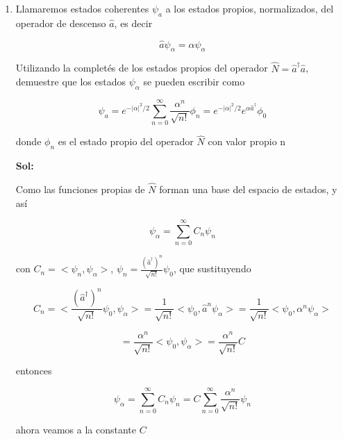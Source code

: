 \documentclass[12pt,a4paper]{article}
\begin{document}
\begin{enumerate}



\item Llamaremos estados coherentes $\psi_{a}$ a los estados propios, normalizados, del operador de descenso $\hat{a}$, es decir

\begin{equation*}
    \hat{a} \psi_{\alpha} = \alpha \psi_{\alpha}
\end{equation*}

Utilizando la completés de los estados propios del operador $\hat{N} = \hat{a}^{\dagger}\hat{a}$, demuestre que los estados $\psi_{\alpha}$ se pueden escribir como

\begin{equation*}
    \psi_a = e^{-|\alpha|^{2}/2} \sum_{n=0}^{\infty} \frac{\alpha^n}{\sqrt{n!}}\phi_{n} = e^{-|\alpha|^{2}/2} e^{\alpha \hat{a}^{\dagger}} \phi_0
\end{equation*}

donde $\phi_n$ es el estado propio del operador $\hat{N}$ con valor propio n

\textbf{Sol:}

Como las funciones propias de $\hat{N}$ forman una base del espacio de estados, y así

\begin{equation*}
    \psi_\alpha = \sum_{n = 0}^{\infty} C_n  \psi_n
\end{equation*}

con $C_n = <\psi_n , \psi_\alpha>$, $\psi_{n} = \frac{(\hat{a}^{\dagger})^{n}}{\sqrt{n!}} \psi_0$, que sustituyendo

\begin{equation*}
    C_n = <\frac{(\hat{a}^{\dagger})^{n}}{\sqrt{n!}} \psi_0,\psi_\alpha> = \frac{1}{\sqrt{n!}}<\psi_0, \hat{a}^{n} \psi_{\alpha}> = \frac{1}{\sqrt{n!}} <\psi_0, \alpha^n \psi_{\alpha}>
\end{equation*}

\begin{equation*}
    = \frac{\alpha^n}{\sqrt{n!}} <\psi_0, \psi_\alpha>= \frac{\alpha^n}{\sqrt{n!}} C
\end{equation*}

entonces

\begin{equation*}
    \psi_{\alpha} = \sum_{n=0}^{\infty} C_n \psi_n = C \sum_{n=0}^{\infty} \frac{\alpha^n}{\sqrt{n!}} \psi_n
\end{equation*}

ahora veamos a la constante $C$


\end{enumerate}
\end{document}
